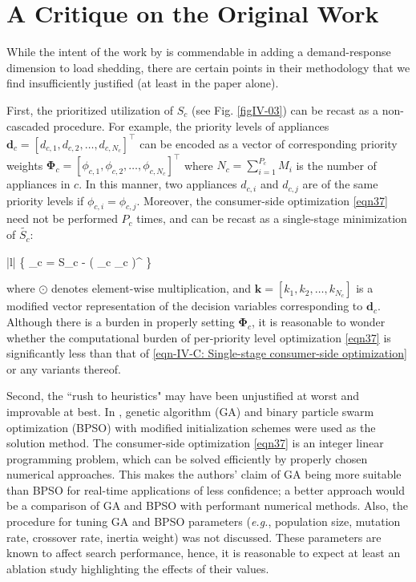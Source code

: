 \documentclass[conference, a4paper]{IEEEtran}
\begin{document}
\section{A Critique on the Original Work}
\label{sec: A Critique on the Original Work}

While the intent of the work by \cite{Jabian2020} is commendable in adding a demand-response dimension to load shedding,
there are certain points in their methodology that we find insufficiently justified (at least in the paper alone).

First, the prioritized utilization of $S_c$ (see Fig. \ref{figIV-03}) can be recast as a non-cascaded procedure.
For example, the priority levels of appliances
$\mathbf{d}_{c} = \left[ d_{c,1}, d_{c,2}, \ldots, d_{c,N_{c}} \right]^{\intercal}$
can be encoded as a vector of corresponding priority weights
$\mathbf{\Phi}_{c} = \left[ \phi_{c,1}, \phi_{c,2}, \ldots, \phi_{c,N_{c}} \right]^{\intercal}$
where $N_{c} = \sum_{i=1}^{P_{c}} M_{i}$ is the number of appliances in $c$.
In this manner, two appliances $d_{c,i}$ and $d_{c,j}$ are
of the same priority levels if $\phi_{c,i} = \phi_{c,j}$.
Moreover, the consumer-side optimization \eqref{eqn37} need not be performed $P_{c}$ times,
and can be recast as a single-stage minimization of $\tilde{S_{c}}$:
\begin{maxi!}|l|
	{}
	{ \left\{ _{c} = S_{c} - \left( \mathbf{\Phi}_{c} \odot {}_{c} \right)^{\intercal}  \right\} }
	{\label{eqn-IV-C: Single-stage consumer-side optimization}}
	{}{}
\end{maxi!}
where $\odot$ denotes element-wise multiplication,
and $\mathbf{k} = \left[k_{1}, k_{2}, \ldots, k_{N_{c}} \right]$ is a modified vector representation of the decision variables corresponding to $\mathbf{d}_{c}$.
Although there is a burden in properly setting $\mathbf{\Phi}_{c}$,
it is reasonable to wonder whether the computational burden of per-priority level optimization \eqref{eqn37}
is significantly less than that of \eqref{eqn-IV-C: Single-stage consumer-side optimization} or any variants thereof.

Second, the ``rush to heuristics" may have been unjustified at worst and improvable at best.
In \cite{Jabian2020}, genetic algorithm (GA) and binary particle swarm optimization (BPSO)
with modified initialization schemes were used as the solution method.
The consumer-side optimization \eqref{eqn37} is an integer linear programming problem,
which can be solved efficiently by properly chosen numerical approaches.
This makes the authors' claim of GA being more suitable than BPSO for real-time applications
of less confidence;
a better approach would be a comparison of GA and BPSO with performant numerical methods.
Also, the procedure for tuning GA and BPSO parameters
(\textit{e.g.}, population size, mutation rate, crossover rate, inertia weight)
was not discussed.
These parameters are known to affect search performance, hence,
it is reasonable to expect at least an ablation study highlighting the effects of their values.
\end{document}

